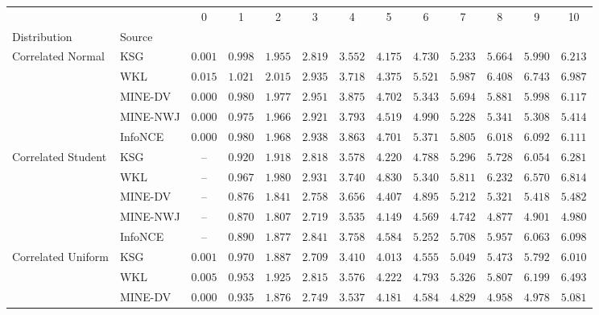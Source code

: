 \begin{tabular}{llccccccccccc}
\toprule
 &  & 0 & 1 & 2 & 3 & 4 & 5 & 6 & 7 & 8 & 9 & 10 \\
Distribution & Source &  &  &  &  &  &  &  &  &  &  &  \\
\midrule
\multirow[l]{5}{*}{Correlated Normal} & KSG & $ 0.001 $ & $ 0.998 $ & $ 1.955 $ & $ 2.819 $ & $ 3.552 $ & $ 4.175 $ & $ 4.730 $ & $ 5.233 $ & $ 5.664 $ & $ 5.990 $ & $ 6.213 $ \\
 & WKL & $ 0.015 $ & $ 1.021 $ & $ 2.015 $ & $ 2.935 $ & $ 3.718 $ & $ 4.375 $ & $ 5.521 $ & $ 5.987 $ & $ 6.408 $ & $ 6.743 $ & $ 6.987 $ \\
 & MINE-DV & $ 0.000 $ & $ 0.980 $ & $ 1.977 $ & $ 2.951 $ & $ 3.875 $ & $ 4.702 $ & $ 5.343 $ & $ 5.694 $ & $ 5.881 $ & $ 5.998 $ & $ 6.117 $ \\
 & MINE-NWJ & $ 0.000 $ & $ 0.975 $ & $ 1.966 $ & $ 2.921 $ & $ 3.793 $ & $ 4.519 $ & $ 4.990 $ & $ 5.228 $ & $ 5.341 $ & $ 5.308 $ & $ 5.414 $ \\
 & InfoNCE & $ 0.000 $ & $ 0.980 $ & $ 1.968 $ & $ 2.938 $ & $ 3.863 $ & $ 4.701 $ & $ 5.371 $ & $ 5.805 $ & $ 6.018 $ & $ 6.092 $ & $ 6.111 $ \\
\cmidrule{1-13}
\multirow[l]{5}{*}{Correlated Student} & KSG & -- & $ 0.920 $ & $ 1.918 $ & $ 2.818 $ & $ 3.578 $ & $ 4.220 $ & $ 4.788 $ & $ 5.296 $ & $ 5.728 $ & $ 6.054 $ & $ 6.281 $ \\
 & WKL & -- & $ 0.967 $ & $ 1.980 $ & $ 2.931 $ & $ 3.740 $ & $ 4.830 $ & $ 5.340 $ & $ 5.811 $ & $ 6.232 $ & $ 6.570 $ & $ 6.814 $ \\
 & MINE-DV & -- & $ 0.876 $ & $ 1.841 $ & $ 2.758 $ & $ 3.656 $ & $ 4.407 $ & $ 4.895 $ & $ 5.212 $ & $ 5.321 $ & $ 5.418 $ & $ 5.482 $ \\
 & MINE-NWJ & -- & $ 0.870 $ & $ 1.807 $ & $ 2.719 $ & $ 3.535 $ & $ 4.149 $ & $ 4.569 $ & $ 4.742 $ & $ 4.877 $ & $ 4.901 $ & $ 4.980 $ \\
 & InfoNCE & -- & $ 0.890 $ & $ 1.877 $ & $ 2.841 $ & $ 3.758 $ & $ 4.584 $ & $ 5.252 $ & $ 5.708 $ & $ 5.957 $ & $ 6.063 $ & $ 6.098 $ \\
\cmidrule{1-13}
\multirow[l]{5}{*}{Correlated Uniform} & KSG & $ 0.001 $ & $ 0.970 $ & $ 1.887 $ & $ 2.709 $ & $ 3.410 $ & $ 4.013 $ & $ 4.555 $ & $ 5.049 $ & $ 5.473 $ & $ 5.792 $ & $ 6.010 $ \\
 & WKL & $ 0.005 $ & $ 0.953 $ & $ 1.925 $ & $ 2.815 $ & $ 3.576 $ & $ 4.222 $ & $ 4.793 $ & $ 5.326 $ & $ 5.807 $ & $ 6.199 $ & $ 6.493 $ \\
 & MINE-DV & $ 0.000 $ & $ 0.935 $ & $ 1.876 $ & $ 2.749 $ & $ 3.537 $ & $ 4.181 $ & $ 4.584 $ & $ 4.829 $ & $ 4.958 $ & $ 4.978 $ & $ 5.081 $ \\

\end{tabular}
